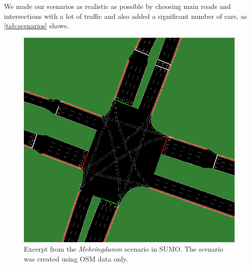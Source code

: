 \begin{table}%
\centering
\caption{Most important attributes of our simulation scenarios.}%
\label{tab:scenarios}
\end{table}

We made our scenarios as realistic as possible by choosing main roads and intersections with a lot of traffic and also added a significant number of cars, as \cref{tab:scenarios} shows.
\begin{figure}
    \centering
    \includegraphics[width=\columnwidth]{fig/mehringdamm_screenshot.png}
    \caption{%
        Excerpt from the \textit{Mehringdamm} scenario in SUMO.
        The scenario was created using OSM data only.
    }%
    \label{fig:mehringdamm_sumo}
\end{figure}

